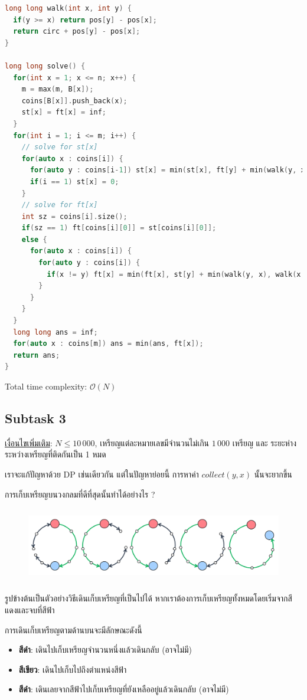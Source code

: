 \documentclass[12pt]{article}
\begin{document}
\begin{lstlisting}[language=C++]
long long walk(int x, int y) {
  if(y >= x) return pos[y] - pos[x];
  return circ + pos[y] - pos[x];
}

long long solve() {
  for(int x = 1; x <= n; x++) {
    m = max(m, B[x]);
    coins[B[x]].push_back(x);
    st[x] = ft[x] = inf;
  }
  for(int i = 1; i <= m; i++) {
    // solve for st[x]
    for(auto x : coins[i]) {
      for(auto y : coins[i-1]) st[x] = min(st[x], ft[y] + min(walk(y, x), walk(x, y)));
      if(i == 1) st[x] = 0;
    }
    // solve for ft[x]
    int sz = coins[i].size();
    if(sz == 1) ft[coins[i][0]] = st[coins[i][0]];
    else {
      for(auto x : coins[i]) {
        for(auto y : coins[i]) {
          if(x != y) ft[x] = min(ft[x], st[y] + min(walk(y, x), walk(x, y)));
        }
      }
    }
  }
  long long ans = inf;
  for(auto x : coins[m]) ans = min(ans, ft[x]); 
  return ans;
}
\end{lstlisting}

Total time complexity: $\mathcal{O}(N)$

\subsection{Subtask 3}

\underline{เงื่อนไขเพิ่มเติม}: $N \leq 10\,000$, เหรียญแต่ละหมายเลขมีจำนวนไม่เกิน $1\,000$ เหรียญ และ ระยะห่างระหว่างเหรียญที่ติดกันเป็น 1 หมด

เราจะแก้ปัญหาด้วย DP เช่นเดียวกัน แต่ในปัญหาย่อยนี้ การหาค่า $collect(y, x)$ นั้นจะยากขึ้น

การเก็บเหรียญบนวงกลมที่ดีที่สุดนั้นทำได้อย่างไร ?

\begin{figure}[h]
  \centering
  \includegraphics[height=3.3cm]{./images/coins2.png}
\end{figure}

รูปข้างต้นเป็นตัวอย่างวิธีเดินเก็บเหรียญที่เป็นไปได้ หากเราต้องการเก็บเหรียญทั้งหมดโดยเริ่มจากสีแดงและจบที่สีฟ้า

การเดินเก็บเหรียญตามด้านบนจะมีลักษณะดังนี้
\begin{itemize}
  \item \textbf{สีดำ}: เดินไปเก็บเหรียญจำนวนหนึ่งแล้วเดินกลับ (อาจไม่มี)
  \item \textbf{สีเขียว}: เดินไปเก็บไปถึงตำแหน่งสีฟ้า
  \item \textbf{สีดำ}: เดินเลยจากสีฟ้าไปเก็บเหรียญที่ยังเหลืออยู่แล้วเดินกลับ (อาจไม่มี)
\end{itemize}
\end{document}
